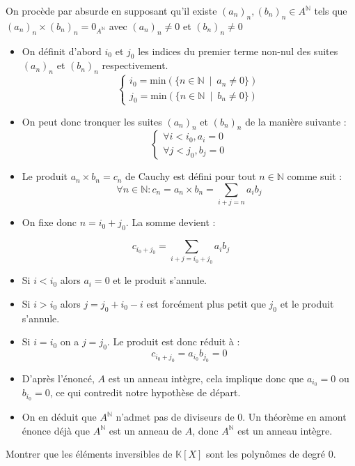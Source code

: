 \documentclass[11pt, a4paper]{article}
\theoremstyle{definition}
\begin{document}
On procède par absurde en supposant qu'il existe $(a_n)_n,(b_n)_n \in A^\mathbb{N}$ tels que $(a_n)_n \times (b_n)_n = 0_{A^\mathbb{N}}$ avec $(a_n)_n \ne 0$ et $(b_n)_n \ne 0$
\begin{itemize}
\item On définit d'abord $i_0$ et $j_0$ les indices du premier terme non-nul des suites $(a_n)_n$ et $(b_n)_n$ respectivement.
\[
\begin{cases} i_0 = \mathrm{min}(\{n \in \mathbb{N} ~\mid~ a_n \ne 0\}) \\ j_0 = \mathrm{min}(\{n \in \mathbb{N} ~\mid~ b_n \ne 0\})\end{cases}
\]
\item On peut donc tronquer les suites $(a_n)_n$ et $(b_n)_n$ de la manière suivante :
\[
\begin{cases} \forall i < i_0, a_i = 0 \\ \forall j < j_0, b_j = 0\end{cases}
\]
\item Le produit $a_n \times b_n = c_n$ de Cauchy est défini pour tout $n \in \mathbb{N}$ comme suit :
\[
\forall n \in \mathbb{N} : c_n = a_n \times b_n = \sum_{i+j=n} a_ib_j
\]
\item On fixe donc $n = i_0 + j_0$. La somme devient :
\end{itemize}
\[
c_{i_0 + j_0} = \sum_{i+j=i_0+j_0} a_ib_j
\]
\begin{itemize}
\item Si $i < i_0$ alors $a_i = 0$ et le produit s'annule.
\item Si $i > i_0$ alors $j = j_0 + i_0 - i$ est forcément plus petit que $j_0$ et le produit s'annule.
\item Si $i=i_0$ on a $j = j_0$. Le produit est donc réduit à :
\[
c_{i_0+j_0} = a_{i_0} b_{j_0} = 0
\]
\item D'après l'énoncé, $A$ est un anneau intègre, cela implique donc que $a_{i_0} = 0$ ou $b_{i_0} = 0$, ce qui contredit notre hypothèse de départ.
\item On en déduit que $A^\mathbb{N}$ n'admet pas de diviseurs de 0. Un théorème en amont énonce déjà que $A^\mathbb{N}$ est un anneau de $A$, donc $A^\mathbb{N}$ est un anneau intègre.
\end{itemize}

\clearpage

\begin{tcolorbox}[instructionstyle]
Montrer que les éléments inversibles de $\mathbb{K}[X]$ sont les polynômes de degré 0.
\end{tcolorbox}
\end{document}
